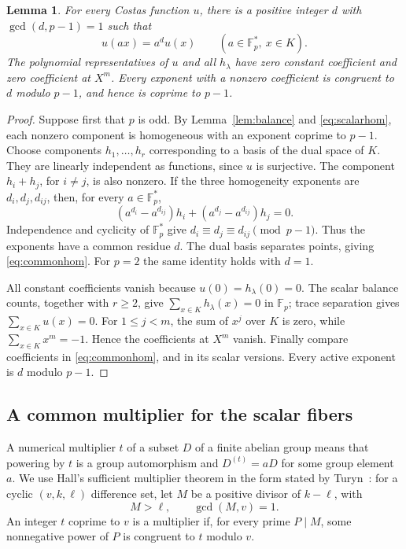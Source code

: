 \documentclass[11pt]{article}
\newtheorem{lemma}[theorem]{Lemma}
\theoremstyle{definition}
\theoremstyle{remark}
\newcommand{\Fp}{\mathbb F_p}
\numberwithin{equation}{section}
\begin{document}
\begin{lemma}\label{lem:homogeneity}
For every Costas function \(u\), there is a positive integer \(d\) with
\(\gcd(d,p-1)=1\) such that
\begin{equation}\label{eq:commonhom}
 u(ax)=a^d u(x)\qquad(a\in\Fp^*,\ x\in K).
\end{equation}
The polynomial representatives of \(u\) and all \(h_\lambda\) have
zero constant coefficient and zero coefficient at \(X^m\).
Every exponent with a nonzero coefficient is congruent to \(d\) modulo
\(p-1\), and hence is coprime to \(p-1\).
\end{lemma}
\begin{proof}
Suppose first that \(p\) is odd. By Lemma~\ref{lem:balance} and
\eqref{eq:scalarhom}, each nonzero component is homogeneous with an
exponent coprime to \(p-1\).
Choose components \(h_1,\ldots,h_r\) corresponding to a basis of the
dual space of \(K\). They are linearly independent as functions, since
\(u\) is surjective. The component \(h_i+h_j\), for \(i\ne j\), is
also nonzero. If the three homogeneity exponents are \(d_i,d_j,d_{ij}\),
then, for every \(a\in\Fp^*\),
\[
 (a^{d_i}-a^{d_{ij}})h_i+(a^{d_j}-a^{d_{ij}})h_j=0.
\]
Independence and cyclicity of \(\Fp^*\) give
\(d_i\equiv d_j\equiv d_{ij}\pmod{p-1}\).
Thus the exponents have a common residue \(d\). The dual basis
separates points, giving \eqref{eq:commonhom}.
For \(p=2\) the same identity holds with \(d=1\).

All constant coefficients vanish because \(u(0)=h_\lambda(0)=0\).
The scalar balance counts, together with \(r\ge2\), give
\(\sum_{x\in K}h_\lambda(x)=0\) in \(\Fp\); trace separation gives
\(\sum_{x\in K}u(x)=0\).
For \(1\le j<m\), the sum of \(x^j\) over \(K\) is zero, while
\(\sum_{x\in K}x^m=-1\). Hence the coefficients at \(X^m\) vanish.
Finally compare coefficients in \eqref{eq:commonhom}, and in its scalar
versions. Every active exponent is \(d\) modulo \(p-1\).
\end{proof}

\subsection{A common multiplier for the scalar fibers}

A numerical multiplier \(t\) of a subset \(D\) of a finite abelian
group means that powering by \(t\) is a group automorphism and
\(D^{(t)}=aD\) for some group element \(a\).
We use Hall's sufficient multiplier theorem in the form stated by
Turyn~\cite[p.~386]{Turyn}: for a cyclic \((v,k,\ell)\) difference set,
let \(M\) be a positive divisor of \(k-\ell\), with
\[
 M>\ell,\qquad \gcd(M,v)=1.
\]
An integer \(t\) coprime to \(v\) is a multiplier if, for every prime
\(P\mid M\), some nonnegative power of \(P\) is congruent to \(t\)
modulo \(v\).
\end{document}
